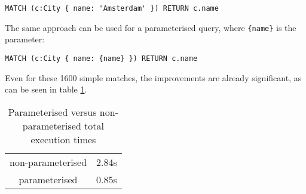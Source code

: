 \begin{lstlisting}[language=cypher, caption={Matching cities without parameterising}, label={lst:query-non-param}]
MATCH (c:City { name: 'Amsterdam' }) RETURN c.name
\end{lstlisting}

The same approach can be used for a parameterised query, where \texttt{\{name\}} is the parameter:
\begin{lstlisting}[language=cypher, caption={Matching cities without parameterising}, label={lst:query-with-param}]
MATCH (c:City { name: {name} }) RETURN c.name
\end{lstlisting}

Even for these 1600 simple matches, the improvements are already significant, as can be seen in table \ref{tbl:param-improvement}.
\begin{table}[H]
\centering
\begin{tabular}{|c|c|}
    \hline
    non-parameterised & 2.84s \\
    parameterised & 0.85s\\
    \hline
\end{tabular}
\caption{Parameterised versus non-parameterised total execution times}
\label{tbl:param-improvement}
\end{table}

